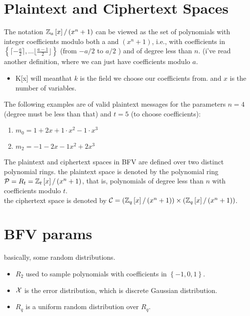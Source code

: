 \section{Plaintext and Ciphertext Spaces}
\begin{defn}
The notation $\mathbb{Z}_{a}\left[x\right]/\left(x^{n}+1\right)$ can be viewed
as the set of polynomials with integer coefficients modulo both a
and $\left(x^{n}+1\right)$, i.e., with coefficients in $\left\{ \lceil-\frac{a}{2}\rceil,\dots\lfloor\frac{a-1}{2}\rfloor\right\} $
(from $-a/2$ to $a/2$ ) and of degree less than $n$. (i've read
another definition, where we can just have coefficients modulo $a$.
\begin{itemize}
\item K{[}x{]} will meanthat $k$ is the field we choose our coefficients
from. and $x$ is the number of variables. 
\end{itemize}
\end{defn}

\begin{example}
The following examples are of valid plaintext messages for the parameters
$n=4$ (degree must be less than that) and $t=5$ (to choose coefficients):
\begin{enumerate}
\item $m_{0}=1+2x+1\cdot x^{2}-1\cdot x^{3}$
\item $m_{2}=-1-2x-1x^{2}+2x^{3}$ 
\end{enumerate}
\end{example}

The plaintext and ciphertext spaces in BFV are defined over two distinct
polynomial rings. the plaintext space is denoted by the polynomial
ring $\mathcal{P}=R_{t}=\mathbb{Z}_{t}\left[x\right]/\left(x^{n}+1\right)$,
that is, polynomials of degree less than $n$ with coefficients modulo
$t$. \\
the ciphertext space is denoted by $\mathcal{C}=\left(\mathbb{Z}_{q}\left[x\right]/\left(x^{n}+1\right)\right)\times\left(\mathbb{Z}_{q}\left[x\right]/\left(x^{n}+1\right)\right)$. 

\section{BFV params}

basically, some random distributions. 
\begin{itemize}
\item $R_{2}$ used to sample polynomials with coefficients in $\left\{ -1,0,1\right\} $.
\item $\mathcal{X}$ is the error distribution, which is discrete Gaussian distribution.
\item $R_{q}$ is a uniform random distribution over $R_{q}$.
\end{itemize}

